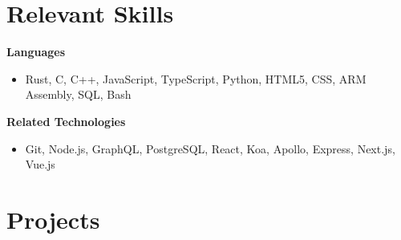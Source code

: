 \documentclass[margin,line]{res}
\begin{document}
\begin{resume}
\section{\sc Relevant Skills}
  {\bf Languages}
  \begin{itemize} \itemsep -2pt
    \item[ ] Rust, C, C++, JavaScript, TypeScript, Python, HTML5, CSS, ARM Assembly, SQL, Bash
  \end{itemize}
  {\bf Related Technologies}
  \begin{itemize} \itemsep -2pt
    \item[ ] Git, Node.js, GraphQL, PostgreSQL, React, Koa, Apollo, Express, Next.js, Vue.js
  \end{itemize}

\section{\sc Projects}


\end{resume}
\end{document}
